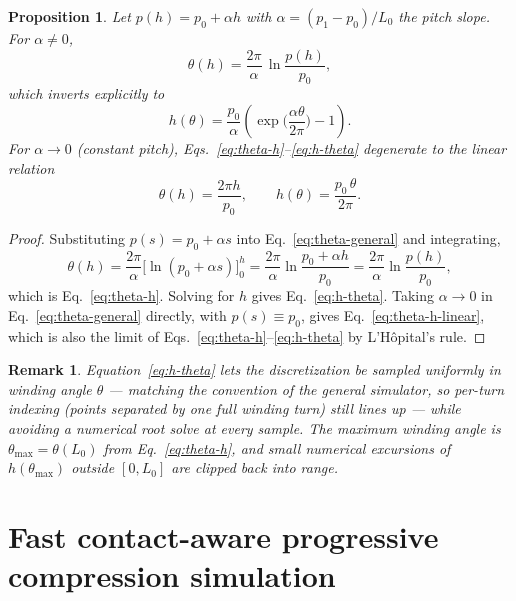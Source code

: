 \documentclass[11pt]{article}
\newtheorem{proposition}{Proposition}
\newtheorem{remark}{Remark}
\begin{document}
\begin{proposition}
Let $p(h) = p_0 + \alpha h$ with $\alpha = (p_1-p_0)/L_0$ the pitch slope.
For $\alpha \neq 0$,
\begin{equation}
\theta(h) = \frac{2\pi}{\alpha}\,\ln\!\frac{p(h)}{p_0},
\label{eq:theta-h}
\end{equation}
which inverts explicitly to
\begin{equation}
h(\theta) = \frac{p_0}{\alpha}\left(\exp\!\Big(\frac{\alpha\theta}{2\pi}\Big) - 1\right).
\label{eq:h-theta}
\end{equation}
For $\alpha \to 0$ (constant pitch), Eqs.~\eqref{eq:theta-h}--\eqref{eq:h-theta}
degenerate to the linear relation
\begin{equation}
\theta(h) = \frac{2\pi h}{p_0}, \qquad h(\theta) = \frac{p_0\,\theta}{2\pi}.
\label{eq:theta-h-linear}
\end{equation}
\end{proposition}

\begin{proof}
Substituting $p(s) = p_0 + \alpha s$ into Eq.~\eqref{eq:theta-general} and
integrating,
\[
\theta(h) = \frac{2\pi}{\alpha}\Big[\ln(p_0+\alpha s)\Big]_0^{h}
= \frac{2\pi}{\alpha}\ln\frac{p_0+\alpha h}{p_0} = \frac{2\pi}{\alpha}\ln\frac{p(h)}{p_0},
\]
which is Eq.~\eqref{eq:theta-h}. Solving for $h$ gives
Eq.~\eqref{eq:h-theta}. Taking $\alpha\to 0$ in
Eq.~\eqref{eq:theta-general} directly, with $p(s)\equiv p_0$, gives
Eq.~\eqref{eq:theta-h-linear}, which is also the limit of
Eqs.~\eqref{eq:theta-h}--\eqref{eq:h-theta} by L'Hôpital's rule.
\end{proof}

\begin{remark}
Equation~\eqref{eq:h-theta} lets the discretization be sampled uniformly
in winding angle $\theta$ — matching the convention of the general
simulator, so per-turn indexing (points separated by one full winding
turn) still lines up — while avoiding a numerical root solve at every
sample. The maximum winding angle is $\theta_{\max} = \theta(L_0)$ from
Eq.~\eqref{eq:theta-h}, and small numerical excursions of
$h(\theta_{\max})$ outside $[0,L_0]$ are clipped back into range.
\end{remark}

\section{Fast contact-aware progressive compression simulation}
\label{sec:fast-sim}
\end{document}

